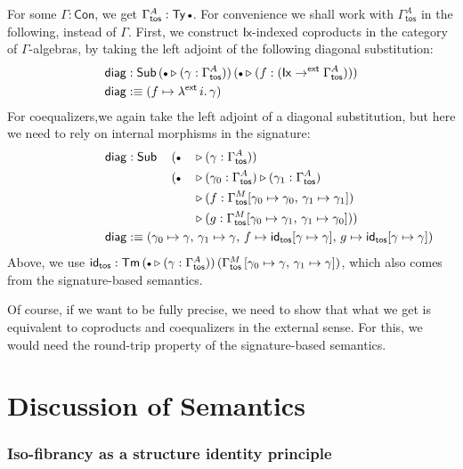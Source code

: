 \documentclass[12pt,a4paper,twoside,openany]{book}
\theoremstyle{remark}
\theoremstyle{definition}
\theoremstyle{theorem}
\newcommand{\ms}[1]{\mathsf{#1}}
\newcommand{\id}{\mathsf{id}}
\newcommand{\Con}{\mathsf{Con}}
\newcommand{\Sub}{\mathsf{Sub}}
\newcommand{\Tm}{\mathsf{Tm}}
\newcommand{\Ty}{\mathsf{Ty}}
\newcommand{\ext}{\triangleright}
\newcommand{\emptycon}{\scaleobj{.75}\bullet}
\newcommand{\toe}{\to^{\ms{ext}}}
\newcommand{\defn}{:\equiv}
\begin{document}
For some $\Gamma : \Con$, we get $\Gamma^A_{\ms{tos}} : \Ty\,\emptycon$. For
convenience we shall work with $\Gamma^A_{\ms{tos}}$ in the following, instead of $\Gamma$. First, we
construct $\ms{Ix}$-indexed coproducts in the category of $\Gamma$-algebras, by
taking the left adjoint of the following diagonal substitution:
\begin{alignat*}{3}
  &\ms{diag} : \Sub\,(\emptycon\ext(\gamma : \Gamma^A_{\ms{tos}}))\,(\emptycon\ext (f : (\ms{Ix} \toe \Gamma^A_{\ms{tos}})))\\
  &\ms{diag} \defn (f \mapsto \lambda^{\ms{ext}}\,i.\,\gamma)
\end{alignat*}
For coequalizers,we again take the left adjoint of a diagonal substitution, but
here we need to rely on internal morphisms in the signature:
\begin{alignat*}{3}
  &\ms{diag} : \Sub\,&&(\emptycon&&\ext(\gamma : \Gamma^A_{\ms{tos}}))\\
  &&&(\emptycon&&\ext (\gamma_0 : \Gamma^A_{\ms{tos}}) \ext (\gamma_1 : \Gamma^A_{\ms{tos}})\\
  &&&&&\ext (f : \Gamma^M_{\ms{tos}}[\gamma_0 \mapsto \gamma_0,\,\gamma_1 \mapsto \gamma_1])\\
  &&&&&\ext (g : \Gamma^M_{\ms{tos}}[\gamma_0 \mapsto \gamma_1,\,\gamma_1 \mapsto \gamma_0]))\\
  &\rlap{$\ms{diag} \defn (\gamma_0 \mapsto \gamma,\,\gamma_1 \mapsto \gamma,\,f \mapsto \id_{\ms{tos}}[\gamma \mapsto \gamma],\,
           g \mapsto \id_{\ms{tos}}[\gamma \mapsto \gamma]) $}
\end{alignat*}
Above, we use $\id_{\ms{tos}} : \Tm\,(\emptycon\ext(\gamma :
\Gamma^A_{\ms{tos}}))\,(\Gamma^M_{\ms{tos}}\,[\gamma_0 \mapsto \gamma,\,\gamma_1
  \mapsto \gamma])$, which also comes from the signature-based semantics.

Of course, if we want to be fully precise, we need to show that what we get is
equivalent to coproducts and coequalizers in the external sense. For this, we
would need the round-trip property of the signature-based semantics.

\section{Discussion of Semantics}

\subsubsection{Iso-fibrancy as a structure identity principle}
\end{document}
